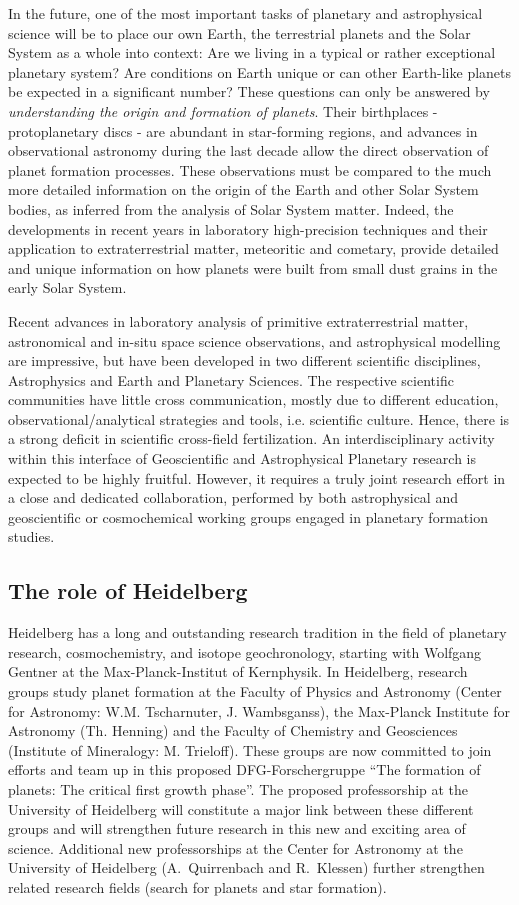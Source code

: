 In the future, one of the most important tasks of planetary and astrophysical science will
be to place our own Earth, the terrestrial planets and the Solar System as a whole
into context: Are we living in a typical or rather exceptional planetary system? Are conditions
on Earth unique or can other Earth-like planets be expected in a significant number?
These questions can only be answered by 
{\it understanding the origin and formation of planets}.
Their birthplaces - protoplanetary discs - are abundant in star-forming regions, and
advances in observational astronomy during the last decade allow the direct observation
of planet formation processes. These observations must be compared to the much more
detailed information on the origin of the Earth and other Solar System bodies, as
inferred from the analysis of Solar System matter. Indeed, the developments in recent years
in laboratory high-precision techniques and their application to extraterrestrial matter,
meteoritic and cometary,  provide detailed and unique information on how planets were built
from small dust grains in the early Solar System.

Recent advances in laboratory analysis of primitive extraterrestrial matter, astronomical and
in-situ space science observations, and astrophysical modelling are impressive, but
have been developed in two different scientific disciplines, Astrophysics and Earth and
Planetary Sciences. The respective scientific communities have little cross communication,
mostly due to different education, observational/analytical strategies and tools,
i.e. scientific culture. Hence, there is a strong deficit in scientific
cross-field fertilization. An interdisciplinary activity within this interface of
Geoscientific and Astrophysical Planetary research is expected to be highly fruitful.
However, it requires a truly joint research effort in a close and dedicated collaboration,
performed by both astrophysical and geoscientific or cosmochemical working groups
engaged in planetary formation studies.
%
\subsection{The role of Heidelberg} 
%
Heidelberg has a long and outstanding research tradition in the field of planetary
research, cosmochemistry, and isotope geochronology, starting with Wolfgang Gentner
at the Max-Planck-Institut of Kernphysik. In Heidelberg, research groups study planet
formation at the Faculty of Physics and Astronomy 
(Center for Astronomy: W.M. Tscharnuter, J. Wambsganss),
the Max-Planck Institute for Astronomy (Th. Henning)
and the Faculty of Chemistry and Geosciences (Institute of Mineralogy: M. Trieloff).
These groups are now committed to join efforts and team up in this
proposed DFG-Forschergruppe
``The formation of planets: The critical first growth phase''.
The proposed professorship at the University of Heidelberg will constitute a
major link between these different groups and will strengthen future research in this
new and exciting area of science.  
Additional new professorships at the Center for Astronomy at the University of 
Heidelberg (A.~Quirrenbach and R.~Klessen) further strengthen related research fields
(search for planets and star formation).

